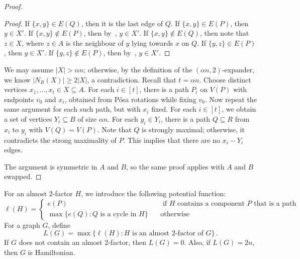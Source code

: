 \documentclass[reqno,final,a4paper]{amsart}
\numberwithin{equation}{section}
\theoremstyle{definition}
\theoremstyle{remark}
\begin{document}
\begin{proof}
\begin{proof}
        If $\{x,y\}\in E(Q)$, then it is the last edge of $Q$. If $\{x,y\}\in E(P)$, then $y\in X'$. If $\{x,y\}\notin E(P)$, then by~, $y\in X'$.
        If $\{x,y\}\notin E(Q)$, then note that $z\in X$, where $z\in A$ is the neighbour of $y$ lying towards $x$ on $Q$. If $\{y,z\}\in E(P)$, then $y\in X'$. If $\{y,z\}\notin E(P)$, then by~, $y\in X'$.
    \end{proof}
    We may assume $|X|>\alpha n$; otherwise, by the definition of the $(\alpha n,2)$-expander, we know $|N_R(X)|\geq 2|X|$, a contradiction.
    Recall that $t = \alpha n$.
    Choose distinct vertices $x_1,\dots, x_t\in X\subseteq A$. For each $i\in [t]$, there is a path $P_i$ on $V(P)$ with endpoints $v_0$ and $x_i$, obtained from P\'osa rotations while fixing $v_0$. 
    Now repeat the same argument for each such path, but with $x_i$ fixed. For each $i\in [t]$, we obtain a set of vertices $Y_i\subseteq B$ of size $\alpha n$. For each $y_i\in Y_i$, there is a path $Q\subseteq R$ from $x_i$ to $y_i$ with $V(Q) = V(P)$. Note that $Q$ is strongly maximal; otherwise, it contradicts the strong maximality of $P$. This implies that there are no $x_i-Y_i$ edges. 
    
    The argument is symmetric in $A$ and $B$, so the same proof applies with $A$ and $B$ swapped.
\end{proof}


For an almost $2$-factor $H$, we introduce the following potential function:
\[
    \ell(H) = \begin{cases}
        e(P) \quad&\text{ if $H$ contains a component $P$ that is a path}\\
        \max\{e(Q): \text{$Q$ is a cycle in $H$}\}\quad&\text{otherwise}
    \end{cases}
\]
For a graph $G$, define 
$$L(G) = \max\{\ell(H): \text{$H$ is an almost $2$-factor of $G$}\}\,.$$
If $G$ does not contain an almost $2$-factor, then $L(G) = 0$. Also, if $L(G) = 2n$, then $G$ is Hamiltonian.
\end{document}
